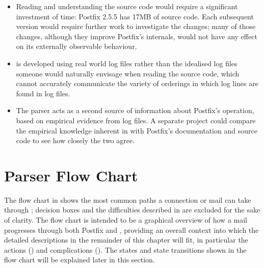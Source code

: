 \begin{itemize}

    \item Reading and understanding the source code would require a
        significant investment of time: Postfix 2.5.5 has 17MB of source
        code.  Each subsequent version would require further work to
        investigate the changes; many of those changes, although they
        improve Postfix's internals, would not have any effect on its
        externally observable behaviour.

    \item \parsername{} is developed using real world log files rather than
        the idealised log files someone would naturally envisage when
        reading the source code, which cannot accurately communicate the
        variety of orderings in which log lines are found in log files.

    \item The parser acts as a second source of information about Postfix's
        operation, based on empirical evidence from log files.  A separate
        project could compare the empirical knowledge inherent in
        \parsername{} with Postfix's documentation and source code to see
        how closely the two agree.

\end{itemize}



\section{Parser Flow Chart}

\label{flow chart}

The flow chart in  shows the most common paths
a connection or mail can take through \parsername{}; decision boxes and the
difficulties described in  are excluded for the
sake of clarity.  The flow chart is intended to be a graphical overview of
how a mail progresses through both Postfix and \parsername{}, providing an
overall context into which the detailed descriptions in the remainder of
this chapter will fit, in particular the actions () and complications ().  The
states and state transitions shown in the flow chart will be explained
later in this section.


